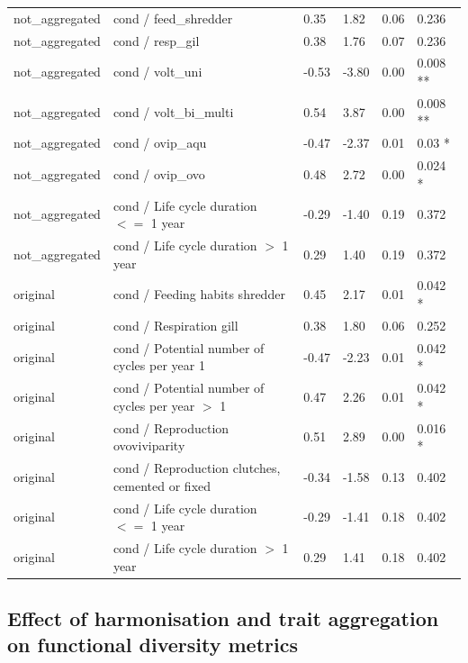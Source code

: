 \documentclass[12pt]{article}
\begin{document}
\begin{longtable}[H]{m{2.6cm}|m{7.3cm}|m{1cm}|m{1.4cm}|m{1.5cm}|m{1.5cm}}
      \midrule 
      not\_aggregated & cond / feed\_shredder & 0.35 & 1.82 & 0.06 & 0.236 \\ 
      not\_aggregated & cond / resp\_gil & 0.38 & 1.76 & 0.07 & 0.236 \\ 
      not\_aggregated & cond / volt\_uni & -0.53 & -3.80 & 0.00 & 0.008 ** \\ 
      not\_aggregated & cond / volt\_bi\_multi & 0.54 & 3.87 & 0.00 & 0.008 ** \\ 
      not\_aggregated & cond / ovip\_aqu & -0.47 & -2.37 & 0.01 & 0.03 * \\ 
      not\_aggregated & cond / ovip\_ovo & 0.48 & 2.72 & 0.00 & 0.024 * \\ 
      not\_aggregated & cond / Life cycle duration $<=$ 1 year & -0.29 & -1.40 & 0.19 & 0.372 \\ 
      not\_aggregated & cond / Life cycle duration $>$ 1 year & 0.29 & 1.40 & 0.19 & 0.372 \\
      \midrule 
      original & cond / Feeding habits shredder & 0.45 & 2.17 & 0.01 & 0.042 * \\
      original & cond / Respiration gill & 0.38 & 1.80 & 0.06 & 0.252 \\  
      original & cond / Potential number of cycles per year 1 & -0.47 & -2.23 & 0.01 & 0.042 * \\ 
      original & cond / Potential number of cycles per year $>$ 1 & 0.47 & 2.26 & 0.01 & 0.042 * \\ 
      original & cond / Reproduction ovoviviparity & 0.51 & 2.89 & 0.00 & 0.016 * \\ 
      original & cond / Reproduction clutches, cemented or fixed & -0.34 & -1.58 & 0.13 & 0.402 \\  
      original & cond / Life cycle duration $<=$ 1 year & -0.29 & -1.41 & 0.18 & 0.402 \\ 
      original & cond / Life cycle duration $>$ 1 year & 0.29 & 1.41 & 0.18 & 0.402 \\
      \bottomrule
\end{longtable}


\newpage 

\subsection*{Effect of harmonisation and trait aggregation on functional diversity metrics}
\end{document}
